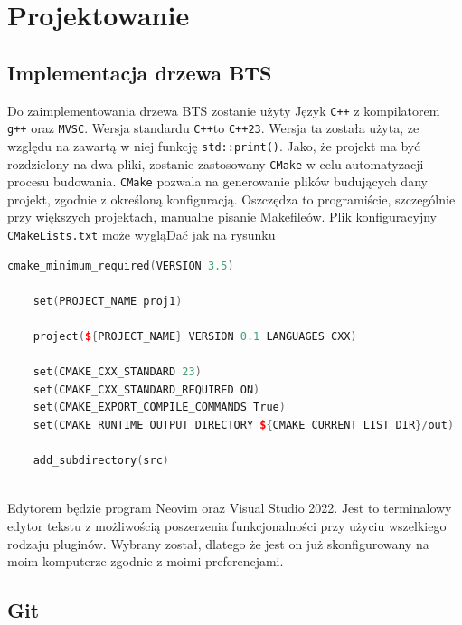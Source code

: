 	\newpage
\section{Projektowanie}		%

\subsection{Implementacja drzewa BTS}


Do zaimplementowania drzewa BTS zostanie użyty Język \texttt{C++} z kompilatorem \texttt{g++} oraz \texttt{MVSC}. Wersja standardu \texttt{C++}to \texttt{C++23}. Wersja ta została użyta, ze względu na zawartą w niej funkcję \texttt{std::print()}. Jako, że projekt ma być rozdzielony na dwa pliki, zostanie zastosowany \texttt{CMake} w celu automatyzacji procesu budowania. \texttt{CMake} pozwala na generowanie plików budujących dany projekt, zgodnie z określoną konfiguracją. Oszczędza to programiście, szczególnie przy większych projektach, manualne pisanie Makefileów.
Plik konfiguracyjny \texttt{CMakeLists.txt} może wygląDać jak na rysunku

\begin{lstlisting}[caption=Plik konfiguracyjny CMake, label={lst:cmakelists}, language=C++]
	cmake_minimum_required(VERSION 3.5)
	
	set(PROJECT_NAME proj1)
	
	project(${PROJECT_NAME} VERSION 0.1 LANGUAGES CXX)
	
	set(CMAKE_CXX_STANDARD 23)
	set(CMAKE_CXX_STANDARD_REQUIRED ON)
	set(CMAKE_EXPORT_COMPILE_COMMANDS True)
	set(CMAKE_RUNTIME_OUTPUT_DIRECTORY ${CMAKE_CURRENT_LIST_DIR}/out)
	
	add_subdirectory(src)
	
\end{lstlisting}

Edytorem będzie program Neovim oraz Visual Studio 2022. Jest to terminalowy edytor tekstu z możliwością poszerzenia funkcjonalności przy użyciu wszelkiego rodzaju pluginów. Wybrany został, dlatego że jest on już skonfigurowany na moim komputerze zgodnie z moimi preferencjami.
\subsection{Git}

